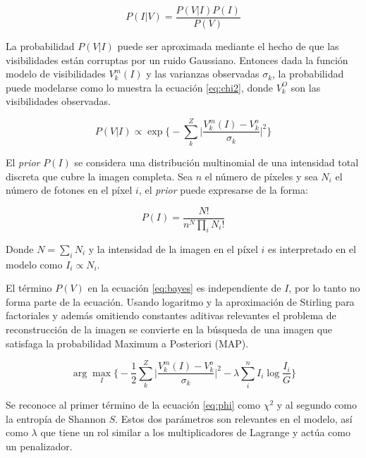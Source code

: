 \begin{equation}
P(I|V) = \frac{P(V|I)P(I)}{P(V)}
\label{eq:bayes}
\end{equation}	

La probabilidad $P(V|I)$ puede ser aproximada mediante el hecho de que las visibilidades están corruptas por un ruido Gaussiano. Entonces dada la función modelo de visibilidades $V_{k}^{m}(I)$ y las varianzas observadas $\sigma_k$, la probabilidad puede modelarse como lo muestra la ecuación \ref{eq:chi2}, donde $V_{k}^{O}$ son las visibilidades observadas.

\begin{equation}
 P(V|I) \propto \exp\biggl\{-\sum_k^{Z}{\biggl|\frac{V^m_k(I)-V^o_k}{\sigma_k}}\biggr|^2\biggr\}
 \label{eq:chi2}
\end{equation} 

El \textit{prior} $P(I)$ se considera una distribución multinomial de una intensidad total discreta que cubre la imagen completa. Sea $n$ el número de píxeles y sea $N_{i}$ el número de fotones en el píxel $i$, el \textit{prior} puede expresarse de la forma:

\begin{equation}
P(I) = \frac{N!}{n^N\prod_i{N_i!}} 
\label{eq:imageProb}
\end{equation}

Donde $N=\sum_i N_{i}$ y la intensidad de la imagen en el píxel $i$ es interpretado en el modelo como $I_{i} \propto N_{i}$.

El término $P(V)$ en la ecuación \ref{eq:bayes} es independiente de $I$, por lo tanto no forma parte de la ecuación. Usando logaritmo y la aproximación de Stirling para factoriales y además omitiendo constantes aditivas relevantes el problema de reconstrucción de la imagen se convierte en la búsqueda de una imagen que satisfaga la probabilidad Maximum a Posteriori (MAP).

\begin{equation}
\arg \max_{I} \biggl\{
            -\frac{1}{2} \sum_k^{Z}{ \biggl| \frac{V^m_k(I)-V^o_k}{\sigma_k}  \biggr|^2 }-
            \lambda \sum_i^{n}{I_i \log{\frac{I_i}{G}}}
            \biggr\}
\label{eq:phi}
\end{equation} 

Se reconoce al primer término de la ecuación \ref{eq:phi} como $\chi^{2}$ y al segundo como la entropía de Shannon $S$. Estos dos parámetros son relevantes en el modelo, así como $\lambda$ que tiene un rol similar a los multiplicadores de Lagrange y actúa como un penalizador.

